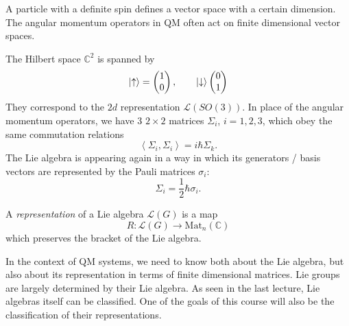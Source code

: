 
A particle with a definite spin defines a vector space with a certain dimension.
The angular momentum operators in QM often act on finite dimensional vector spaces.
\begin{example}[$\mathbb{C}^2$]
The Hilbert space $\mathbb{C}^2$ is spanned by
\begin{equation}
  \ket{\uparrow} =
  \begin{pmatrix}
  1 \\
  0 \\
  \end{pmatrix},
  \qquad
  \ket{\downarrow}
  \begin{pmatrix}
  0 \\
  1 \\
  \end{pmatrix}
\end{equation}
  They correspond to the $2d$ representation $\mathcal{L}(SO(3))$. In place of the angular momentum operators, we have 3 $2\times 2$ matrices $\Sigma_i$, $i = 1,2,3$, which obey the same commutation relations
  \begin{equation}
    \left\langle \Sigma_i , \Sigma_i \right\rangle = i \hbar \Sigma_k.
  \end{equation}
  The Lie algebra is appearing again in a way in which its generators / basis vectors are represented by the Pauli matrices $\sigma_i$:
  \begin{equation}
    \Sigma_i = \frac{1}{2} \hbar \sigma_i.
  \end{equation}
\end{example}

\begin{definition}[Representation]
  A \emph{representation} of a Lie algebra $\mathcal{L}(G)$ is a map
  \begin{equation}
    R \colon \mathcal{L}(G) \to \text{Mat}_n (\mathbb{C})
  \end{equation}
  which preserves the bracket of the Lie algebra.
\end{definition}

\begin{leftbar}
  \begin{remark}
    In the context of QM systems, we need to know both about the Lie algebra, but also about its representation in terms of finite dimensional matrices.
    Lie groups are largely determined by their Lie algebra. As seen in the last lecture, Lie algebras itself can be classified. One of the goals of this course will also be the classification of their representations.
  \end{remark}
\end{leftbar}

